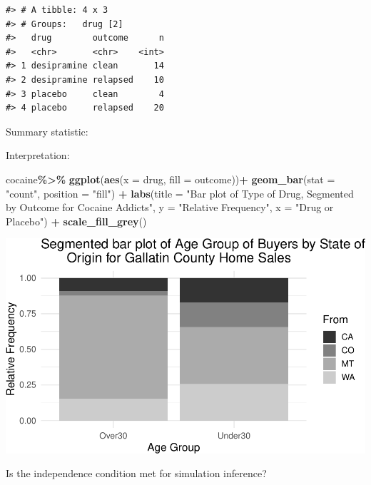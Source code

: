 \documentclass[
]{report}
\newenvironment{Shaded}{\begin{snugshade}}{\end{snugshade}}
\newcommand{\AttributeTok}[1]{\textcolor[rgb]{0.13,0.29,0.53}{#1}}
\newcommand{\FunctionTok}[1]{\textcolor[rgb]{0.13,0.29,0.53}{\textbf{#1}}}
\newcommand{\NormalTok}[1]{#1}
\newcommand{\SpecialCharTok}[1]{\textcolor[rgb]{0.81,0.36,0.00}{\textbf{#1}}}
\newcommand{\StringTok}[1]{\textcolor[rgb]{0.31,0.60,0.02}{#1}}
\begin{document}
\begin{verbatim}
#> # A tibble: 4 x 3
#> # Groups:   drug [2]
#>   drug        outcome      n
#>   <chr>       <chr>    <int>
#> 1 desipramine clean       14
#> 2 desipramine relapsed    10
#> 3 placebo     clean        4
#> 4 placebo     relapsed    20
\end{verbatim}

Summary statistic:

\vspace{0.3in}

Interpretation:

\vspace{0.4in}

\begin{Shaded}
\begin{Highlighting}[]
\NormalTok{cocaine}\SpecialCharTok{\%\textgreater{}\%}
  \FunctionTok{ggplot}\NormalTok{(}\FunctionTok{aes}\NormalTok{(}\AttributeTok{x =}\NormalTok{ drug, }\AttributeTok{fill =}\NormalTok{ outcome))}\SpecialCharTok{+}
  \FunctionTok{geom\_bar}\NormalTok{(}\AttributeTok{stat =} \StringTok{"count"}\NormalTok{, }\AttributeTok{position =} \StringTok{"fill"}\NormalTok{) }\SpecialCharTok{+}
  \FunctionTok{labs}\NormalTok{(}\AttributeTok{title =} \StringTok{"Bar plot of Type of Drug, Segmented by }
\StringTok{       Outcome for Cocaine Addicts"}\NormalTok{,}
       \AttributeTok{y =} \StringTok{"Relative Frequency"}\NormalTok{,}
       \AttributeTok{x =} \StringTok{"Drug or Placebo"}\NormalTok{) }\SpecialCharTok{+}
    \FunctionTok{scale\_fill\_grey}\NormalTok{()}
\end{Highlighting}
\end{Shaded}

\begin{center}\includegraphics[width=0.6\linewidth]{08-VN08-two-cat-simulation_files/figure-latex/unnamed-chunk-4-1} \end{center}

Is the independence condition met for simulation inference?

\vspace{0.4in}
\end{document}
